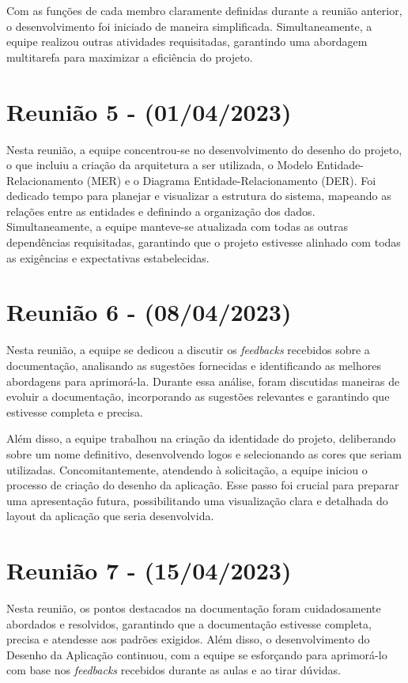 \begin{apendicesenv}
Com as funções de cada membro claramente definidas durante a reunião anterior, o desenvolvimento foi iniciado de maneira simplificada. Simultaneamente, a equipe realizou outras atividades requisitadas, garantindo uma abordagem multitarefa para maximizar a eficiência do projeto.

\section{Reunião 5 - (01/04/2023)}
Nesta reunião, a equipe concentrou-se no desenvolvimento do desenho do projeto, o que incluiu a criação da arquitetura a ser utilizada, o Modelo Entidade-Relacionamento (MER) e o Diagrama Entidade-Relacionamento (DER). Foi dedicado tempo para planejar e visualizar a estrutura do sistema, mapeando as relações entre as entidades e definindo a organização dos dados. Simultaneamente, a equipe manteve-se atualizada com todas as outras dependências requisitadas, garantindo que o projeto estivesse alinhado com todas as exigências e expectativas estabelecidas.

\section{Reunião 6 - (08/04/2023)}
Nesta reunião, a equipe se dedicou a discutir os \textit{feedbacks} recebidos sobre a documentação, analisando as sugestões fornecidas e identificando as melhores abordagens para aprimorá-la. Durante essa análise, foram discutidas maneiras de evoluir a documentação, incorporando as sugestões relevantes e garantindo que estivesse completa e precisa.

Além disso, a equipe trabalhou na criação da identidade do projeto, deliberando sobre um nome definitivo, desenvolvendo logos e selecionando as cores que seriam utilizadas. Concomitantemente, atendendo à solicitação, a equipe iniciou o processo de criação do desenho da aplicação. Esse passo foi crucial para preparar uma apresentação futura, possibilitando uma visualização clara e detalhada do layout da aplicação que seria desenvolvida.

\section{Reunião 7 - (15/04/2023)}
Nesta reunião, os pontos destacados na documentação foram cuidadosamente abordados e resolvidos, garantindo que a documentação estivesse completa, precisa e atendesse aos padrões exigidos. Além disso, o desenvolvimento do Desenho da Aplicação continuou, com a equipe se esforçando para aprimorá-lo com base nos \textit{feedbacks} recebidos durante as aulas e ao tirar dúvidas.


\end{apendicesenv}
